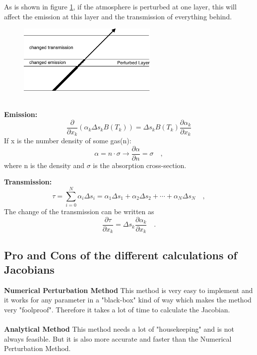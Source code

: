 As is shown in figure \ref{fig:perturbedLayer}, if the atmosphere is perturbed
at one layer, this will affect the emission at this layer and the transmission
of everything behind.
\begin{figure}
	\centering
	
	\includegraphics[width=0.6\textwidth]{./figures/perturbedLayer_EmissionTransmission}
	\caption{}
	\label{fig:perturbedLayer}
\end{figure}
\\
\textbf{Emission:}\\
\begin{equation*}
\frac{\partial}{\partial x_k}(\alpha_k \Delta s_k B(T_k)) = \Delta s_k B(T_k)
\frac{\partial \alpha_k}{\partial x_k}
\end{equation*}
If x is the number density of some gas(n):
\begin{equation}
\alpha=n \cdot \sigma \rightarrow \frac{\partial \alpha}{\partial
  n}=\sigma \quad ,
\end{equation}
where n is the density and $\sigma$ is the absorption cross-section.

\textbf{Transmission:}
\begin{equation}
\tau=\sum_{i=0}^N \alpha_i \Delta s_i = \alpha_1 \Delta s_1 + \alpha_2 \Delta
s_2 + \cdots + \alpha_N \Delta s_N \quad ,
\end{equation}
The change of the transmission can be written as
\begin{equation*}
\frac{\partial \tau}{\partial x_k}=\Delta s_k \frac{\partial \alpha_k}{\partial
	x_k} \quad .
\end{equation*}

\subsection*{Pro and Cons of the different calculations of Jacobians}
\textbf{Numerical Perturbation Method}
This method is very easy to implement and it works for any parameter in a
"black-box" kind of way which makes the method very "foolproof". Therefore it
takes a lot of time to calculate the Jacobian.
\\\\
\textbf{Analytical Method}
This method needs a lot of "housekeeping" and is not always feasible. But it is
also more accurate and faster than the Numerical Perturbation Method.


